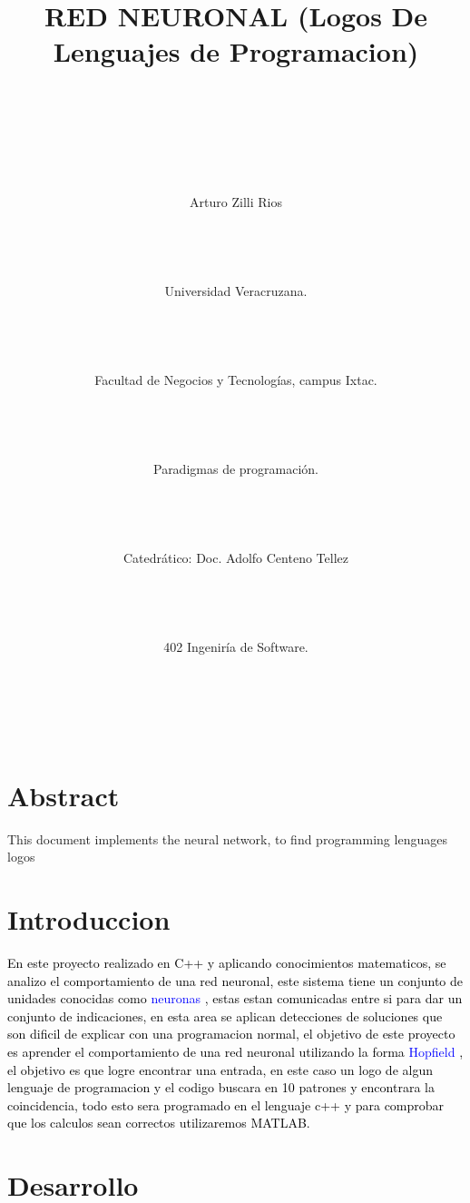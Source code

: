 \documentclass[10pt]{article} %
\title{RED NEURONAL (Logos De Lenguajes de Programacion) \\ \\ \\ \\}
\author{Arturo Zilli Rios  \\ \\ \\ \\ \\ Universidad Veracruzana.  \\ \\ \\ \\ \\ Facultad de Negocios y Tecnologías, campus Ixtac.  \\ \\ \\ \\ \\ Paradigmas de programación. \\ \\ \\ \\ \\Catedrático: Doc. Adolfo Centeno Tellez \\ \\ \\ \\ \\
402 Ingeniría de Software. \\ \\ \\ \\ \\ }
\begin{document}
 
\maketitle


 
 
 


\section{Abstract}


This document implements the neural network, to find programming lenguages logos



\section{Introduccion}

 
\textcolor{black}{En este proyecto realizado en C++ y aplicando conocimientos matematicos, se analizo el comportamiento de una red neuronal, este sistema tiene un conjunto de unidades conocidas como} \textcolor{blue}{neuronas} \textcolor{black}{, estas estan comunicadas entre si para dar un conjunto de indicaciones, en esta area se aplican detecciones de soluciones que son dificil de explicar con una programacion normal, el objetivo de este proyecto es aprender el comportamiento de una red neuronal utilizando la forma} \textcolor{blue}{Hopfield} \textcolor{black}{, el objetivo es que logre encontrar una entrada, en este caso un logo de algun lenguaje de programacion y el codigo buscara en 10 patrones y encontrara la coincidencia, todo esto sera programado en el lenguaje c++ y para comprobar que los calculos sean correctos utilizaremos MATLAB.} \\


 
\section{Desarrollo}
\end{document}
